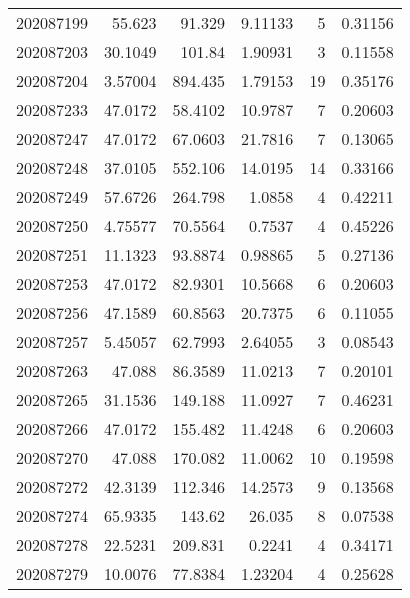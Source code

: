 \begin{tabular}{rrrrrr}
 202087199 &         55.623   &       91.329  &            9.11133 &           5 & 0.31156 \\
 202087203 &         30.1049  &      101.84   &            1.90931 &           3 & 0.11558 \\
 202087204 &          3.57004 &      894.435  &            1.79153 &          19 & 0.35176 \\
 202087233 &         47.0172  &       58.4102 &           10.9787  &           7 & 0.20603 \\
 202087247 &         47.0172  &       67.0603 &           21.7816  &           7 & 0.13065 \\
 202087248 &         37.0105  &      552.106  &           14.0195  &          14 & 0.33166 \\
 202087249 &         57.6726  &      264.798  &            1.0858  &           4 & 0.42211 \\
 202087250 &          4.75577 &       70.5564 &            0.7537  &           4 & 0.45226 \\
 202087251 &         11.1323  &       93.8874 &            0.98865 &           5 & 0.27136 \\
 202087253 &         47.0172  &       82.9301 &           10.5668  &           6 & 0.20603 \\
 202087256 &         47.1589  &       60.8563 &           20.7375  &           6 & 0.11055 \\
 202087257 &          5.45057 &       62.7993 &            2.64055 &           3 & 0.08543 \\
 202087263 &         47.088   &       86.3589 &           11.0213  &           7 & 0.20101 \\
 202087265 &         31.1536  &      149.188  &           11.0927  &           7 & 0.46231 \\
 202087266 &         47.0172  &      155.482  &           11.4248  &           6 & 0.20603 \\
 202087270 &         47.088   &      170.082  &           11.0062  &          10 & 0.19598 \\
 202087272 &         42.3139  &      112.346  &           14.2573  &           9 & 0.13568 \\
 202087274 &         65.9335  &      143.62   &           26.035   &           8 & 0.07538 \\
 202087278 &         22.5231  &      209.831  &            0.2241  &           4 & 0.34171 \\
 202087279 &         10.0076  &       77.8384 &            1.23204 &           4 & 0.25628 \\

\end{tabular}
